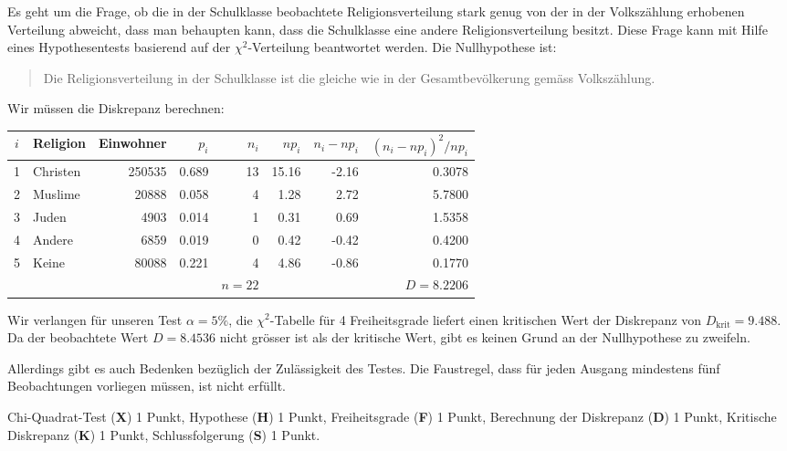\begin{loesung}
Es geht um die Frage, ob die in der Schulklasse beobachtete Religionsverteilung
stark genug von der in der Volkszählung erhobenen Verteilung abweicht,
dass man behaupten kann, dass die Schulklasse eine andere Religionsverteilung
besitzt.
Diese Frage kann mit Hilfe eines Hypothesentests basierend auf der
$\chi^2$-Verteilung beantwortet werden. Die Nullhypothese ist:
\begin{quotation}
\parindent 0pt
Die Religionsverteilung in der Schulklasse ist die gleiche wie in
der Gesamtbevölkerung gemäss Volkszählung.
\end{quotation}
Wir müssen die Diskrepanz berechnen:
\begin{center}
\begin{tabular}{|c|l|r|r|r|r|r|r|}
\hline
$i$&Religion&Einwohner&$p_i$   &$n_i$&$np_i$    &$n_i-np_i$&$(n_i-np_i)^2/np_i$\\
\hline
1  &Christen&   250535&0.689   &   13&15.16   &-2.16   &0.3078\\
2  & Muslime&    20888&0.058   &    4& 1.28   & 2.72   &5.7800\\
3  &   Juden&     4903&0.014   &    1& 0.31   & 0.69   &1.5358\\
4  &  Andere&     6859&0.019   &    0& 0.42   &-0.42   &0.4200\\
5  &   Keine&    80088&0.221   &    4& 4.86   &-0.86   &0.1770\\
\hline
   &        &         &        &$n=22$&       &        &$D=8.2206$\\
\hline
\end{tabular}
\end{center}
Wir verlangen für unseren Test $\alpha=5\%$, die $\chi^2$-Tabelle
für 4 Freiheitsgrade liefert einen kritischen Wert der Diskrepanz
von $D_{\text{krit}}=9.488$. Da der beobachtete Wert $D=8.4536$
nicht grösser ist als der kritische Wert, gibt es keinen Grund an
der Nullhypothese zu zweifeln.

Allerdings gibt es auch Bedenken bezüglich der Zulässigkeit des
Testes.
Die Faustregel, dass für jeden Ausgang mindestens
fünf Beobachtungen vorliegen müssen, ist nicht erfüllt.
\end{loesung}

\begin{bewertung}
Chi-Quadrat-Test ({\bf X}) 1 Punkt,
Hypothese ({\bf H}) 1 Punkt,
Freiheitsgrade ({\bf F}) 1 Punkt,
Berechnung der Diskrepanz ({\bf D}) 1 Punkt,
Kritische Diskrepanz ({\bf K}) 1 Punkt,
Schlussfolgerung ({\bf S}) 1 Punkt.
\end{bewertung}
